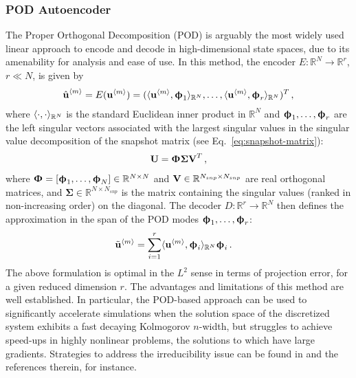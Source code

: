 \subsubsection{POD Autoencoder}\label{sec: lsrom}
The Proper Orthogonal Decomposition (POD) is arguably the most widely used linear approach to encode and decode in high-dimensional state spaces, due to its amenability for analysis and ease of use. In this method, the encoder $E: \mathbb{R}^N \to \mathbb{R}^r$, $r \ll N$, is given by 
\begin{align}
    \hat{\btu}^{\left<m\right>} = E(\btu^{\left<m\right>}) = (\inner{\mathbb{R}^N}{\btu^{\left<m\right>}}{\btphi_1}, \ldots, \inner{\mathbb{R}^N}{\btu^{\left<m\right>}}{\btphi_r})^T\,,
\end{align}
where $\inner{\mathbb{R}^N}{\cdot}{\cdot}$ is the standard Euclidean inner product in $\mathbb{R}^N$ and $\btphi_1, \ldots, \btphi_r$ are the left singular vectors associated with the largest singular values in the singular value decomposition of the snapshot matrix (see Eq.~\eqref{eq:snapshot-matrix}):
\begin{align}
    \btU = \btPhi \boldsymbol{\Sigma} \btV^T\,,
\end{align}
where $\btPhi = [\btphi_1, \ldots, \btphi_{N}] \in \mathbb{R}^{N \times N}$ and $\btV \in \mathbb{R}^{N_{snp} \times N_{snp}}$ are real orthogonal matrices, and $\boldsymbol{\Sigma} \in \mathbb{R}^{N \times N_{snp}}$ is the matrix containing the singular values (ranked in non-increasing order) on the diagonal. The decoder $D:\mathbb{R}^r \to \mathbb{R}^N$ then defines the approximation in the span of the POD modes $\btphi_1, \ldots, \btphi_r$:
\begin{align}
    \tilde{\btu}^{\left<m\right>} &= \sum_{i=1}^r \inner{\mathbb{R}^N}{\btu^{\left<m\right>}}{\btphi_i} \btphi_i\,.
\end{align}
The above formulation is optimal in the $L^2$ sense in terms of projection error, for a given reduced dimension $r$. The advantages and limitations of this method are well established. In particular, the POD-based approach can be used to significantly accelerate simulations when the solution space of the discretized system exhibits a fast decaying Kolmogorov $n$-width, but struggles to achieve speed-ups in highly nonlinear problems, the solutions to which have large gradients. Strategies to address the irreducibility issue can be found in \cite{BARNETT2023112420} and the references therein, for instance.

